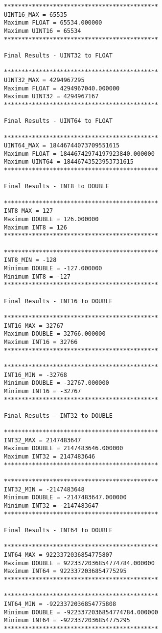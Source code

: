 \begin{verbatim}
********************************************
UINT16_MAX = 65535
Maximum FLOAT = 65534.000000
Maximum UINT16 = 65534
********************************************

Final Results - UINT32 to FLOAT

********************************************
UINT32_MAX = 4294967295
Maximum FLOAT = 4294967040.000000
Maximum UINT32 = 4294967167
********************************************

Final Results - UINT64 to FLOAT

********************************************
UINT64_MAX = 18446744073709551615
Maximum FLOAT = 18446742974197923840.000000
Maximum UINT64 = 18446743523953731615
********************************************

Final Results - INT8 to DOUBLE

********************************************
INT8_MAX = 127
Maximum DOUBLE = 126.000000
Maximum INT8 = 126
********************************************

********************************************
INT8_MIN = -128
Minimum DOUBLE = -127.000000
Minimum INT8 = -127
********************************************

Final Results - INT16 to DOUBLE

********************************************
INT16_MAX = 32767
Maximum DOUBLE = 32766.000000
Maximum INT16 = 32766
********************************************

********************************************
INT16_MIN = -32768
Minimum DOUBLE = -32767.000000
Minimum INT16 = -32767
********************************************

Final Results - INT32 to DOUBLE

********************************************
INT32_MAX = 2147483647
Maximum DOUBLE = 2147483646.000000
Maximum INT32 = 2147483646
********************************************

********************************************
INT32_MIN = -2147483648
Minimum DOUBLE = -2147483647.000000
Minimum INT32 = -2147483647
********************************************

Final Results - INT64 to DOUBLE

********************************************
INT64_MAX = 9223372036854775807
Maximum DOUBLE = 9223372036854774784.000000
Maximum INT64 = 9223372036854775295
********************************************

********************************************
INT64_MIN = -9223372036854775808
Minimum DOUBLE = -9223372036854774784.000000
Minimum INT64 = -9223372036854775295
********************************************


\end{verbatim}
